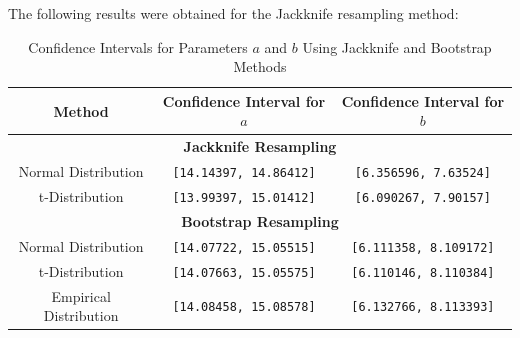 \documentclass[]{article}
\begin{document}
\noindent The following results were obtained for the Jackknife resampling method:

%
%
%

\begin{table}[h]
	\centering
	\begin{tabular}{|c|c|c|}
		\hline
		\textbf{Method} & \textbf{Confidence Interval for $a$} & \textbf{Confidence Interval for $b$} \\
		\hline
		\multicolumn{3}{|c|}{\textbf{Jackknife Resampling}} \\
		\hline
		Normal Distribution & \texttt{[14.14397, 14.86412]} & \texttt{[6.356596, 7.63524]} \\
		t-Distribution & \texttt{[13.99397, 15.01412]} & \texttt{[6.090267, 7.90157]} \\
		\hline
		\multicolumn{3}{|c|}{\textbf{Bootstrap Resampling}} \\
		\hline
		Normal Distribution & \texttt{[14.07722, 15.05515]} & \texttt{[6.111358, 8.109172]} \\
		t-Distribution & \texttt{[14.07663, 15.05575]} & \texttt{[6.110146, 8.110384]} \\
		Empirical Distribution & \texttt{[14.08458, 15.08578]} & \texttt{[6.132766, 8.113393]} \\
		\hline
	\end{tabular}
	\caption{Confidence Intervals for Parameters $a$ and $b$ Using Jackknife and Bootstrap Methods}
	\label{tab:ci_results}
\end{table}
\end{document}
